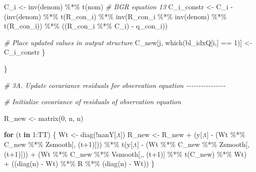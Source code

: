 \documentclass[
]{article}
\newenvironment{Shaded}{\begin{snugshade}}{\end{snugshade}}
\newcommand{\CommentTok}[1]{\textcolor[rgb]{0.56,0.35,0.01}{\textit{#1}}}
\newcommand{\ControlFlowTok}[1]{\textcolor[rgb]{0.13,0.29,0.53}{\textbf{#1}}}
\newcommand{\DecValTok}[1]{\textcolor[rgb]{0.00,0.00,0.81}{#1}}
\newcommand{\FunctionTok}[1]{\textcolor[rgb]{0.00,0.00,0.00}{#1}}
\newcommand{\NormalTok}[1]{#1}
\newcommand{\OtherTok}[1]{\textcolor[rgb]{0.56,0.35,0.01}{#1}}
\newcommand{\SpecialCharTok}[1]{\textcolor[rgb]{0.00,0.00,0.00}{#1}}
\begin{document}
\begin{Shaded}
\begin{Highlighting}[]
\NormalTok{      C\_i }\OtherTok{\textless{}{-}} \FunctionTok{inv}\NormalTok{(denom) }\SpecialCharTok{\%*\%} \FunctionTok{t}\NormalTok{(nom)}
      \CommentTok{\# BGR equation 13}
\NormalTok{      C\_i\_constr }\OtherTok{\textless{}{-}}\NormalTok{ C\_i }\SpecialCharTok{{-}} 
\NormalTok{        (}\FunctionTok{inv}\NormalTok{(denom) }\SpecialCharTok{\%*\%} \FunctionTok{t}\NormalTok{(R\_con\_i) }\SpecialCharTok{\%*\%} \FunctionTok{inv}\NormalTok{(R\_con\_i }\SpecialCharTok{\%*\%} \FunctionTok{inv}\NormalTok{(denom) }\SpecialCharTok{\%*\%} \FunctionTok{t}\NormalTok{(R\_con\_i)) }\SpecialCharTok{\%*\%}\NormalTok{ ((R\_con\_i }\SpecialCharTok{\%*\%}\NormalTok{ C\_i) }\SpecialCharTok{{-}}\NormalTok{ q\_con\_i))}
      
      \CommentTok{\# Place updated values in output structure}
\NormalTok{      C\_new[j, }\FunctionTok{which}\NormalTok{(bl\_idxQ[i,] }\SpecialCharTok{==} \DecValTok{1}\NormalTok{)] }\OtherTok{\textless{}{-}}\NormalTok{ C\_i\_constr}
\NormalTok{    \}}
    
\NormalTok{  \}}
  
  
  \CommentTok{\# 3A. Update covariance residuals for observation equation {-}{-}{-}{-}{-}{-}{-}{-}{-}{-}{-}{-}{-}{-}{-}{-}}
  
  \CommentTok{\# Initialize covariance of residuals of observation equation}
  
\NormalTok{  R\_new }\OtherTok{\textless{}{-}} \FunctionTok{matrix}\NormalTok{(}\DecValTok{0}\NormalTok{, n, n)}
  
  \ControlFlowTok{for}\NormalTok{ (t }\ControlFlowTok{in} \DecValTok{1}\SpecialCharTok{:}\NormalTok{TT) \{}
\NormalTok{    Wt }\OtherTok{\textless{}{-}} \FunctionTok{diag}\NormalTok{(}\SpecialCharTok{!}\NormalTok{nanY[,t])}
\NormalTok{    R\_new }\OtherTok{\textless{}{-}}\NormalTok{ R\_new }\SpecialCharTok{+} 
\NormalTok{      (y[,t] }\SpecialCharTok{{-}} 
\NormalTok{         (Wt }\SpecialCharTok{\%*\%}\NormalTok{ C\_new }\SpecialCharTok{\%*\%}\NormalTok{ Zsmooth[, (t}\SpecialCharTok{+}\DecValTok{1}\NormalTok{)])) }\SpecialCharTok{\%*\%} \FunctionTok{t}\NormalTok{(y[,t] }\SpecialCharTok{{-}}\NormalTok{ (Wt }\SpecialCharTok{\%*\%}\NormalTok{ C\_new }\SpecialCharTok{\%*\%}\NormalTok{ Zsmooth[, (t}\SpecialCharTok{+}\DecValTok{1}\NormalTok{)])) }\SpecialCharTok{+} 
\NormalTok{      (Wt }\SpecialCharTok{\%*\%}\NormalTok{ C\_new }\SpecialCharTok{\%*\%}\NormalTok{ Vsmooth[,, (t}\SpecialCharTok{+}\DecValTok{1}\NormalTok{)] }\SpecialCharTok{\%*\%} \FunctionTok{t}\NormalTok{(C\_new) }\SpecialCharTok{\%*\%}\NormalTok{ Wt) }\SpecialCharTok{+} 
\NormalTok{      ((}\FunctionTok{diag}\NormalTok{(n) }\SpecialCharTok{{-}}\NormalTok{ Wt) }\SpecialCharTok{\%*\%}\NormalTok{ R }\SpecialCharTok{\%*\%}\NormalTok{ (}\FunctionTok{diag}\NormalTok{(n) }\SpecialCharTok{{-}}\NormalTok{ Wt))}
\NormalTok{  \}}
  

\end{Highlighting}
\end{Shaded}
\end{document}
